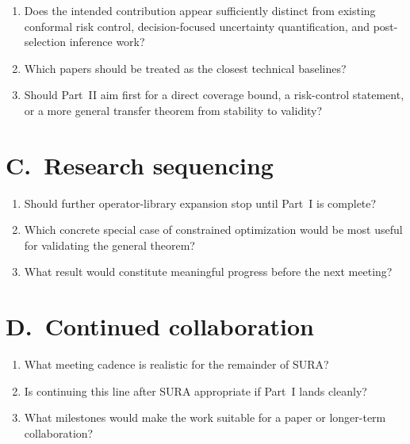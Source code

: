 \documentclass[11pt]{article}
\begin{document}
\begin{enumerate}[leftmargin=1.4em,itemsep=1.5pt]
  \item Does the intended contribution appear sufficiently distinct from existing conformal risk control, decision-focused uncertainty quantification, and post-selection inference work?
  \item Which papers should be treated as the closest technical baselines?
  \item Should Part~II aim first for a direct coverage bound, a risk-control statement, or a more general transfer theorem from stability to validity?
\end{enumerate}

\section*{C.\ Research sequencing}

\begin{enumerate}[leftmargin=1.4em,itemsep=1.5pt]
  \item Should further operator-library expansion stop until Part~I is complete?
  \item Which concrete special case of constrained optimization would be most useful for validating the general theorem?
  \item What result would constitute meaningful progress before the next meeting?
\end{enumerate}

\section*{D.\ Continued collaboration}

\begin{enumerate}[leftmargin=1.4em,itemsep=1.5pt]
  \item What meeting cadence is realistic for the remainder of SURA?
  \item Is continuing this line after SURA appropriate if Part~I lands cleanly?
  \item What milestones would make the work suitable for a paper or longer-term collaboration?
\end{enumerate}

\vspace{4pt}
\end{document}
